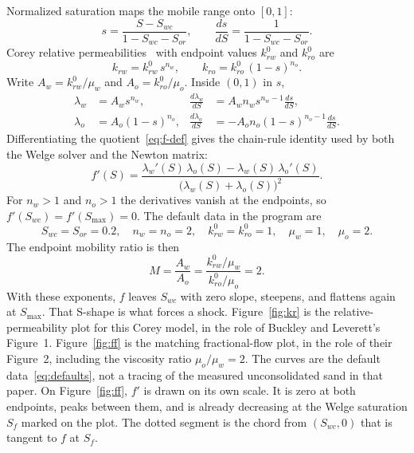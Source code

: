 \documentclass[11pt]{article}
\begin{document}
Normalized saturation maps the mobile range onto $[0,1]$:
\begin{equation}
\label{eq:sn}
s = \frac{S - S_{wc}}{1 - S_{wc} - S_{or}},
\qquad
\frac{ds}{dS} = \frac{1}{1 - S_{wc} - S_{or}}.
\end{equation}
Corey relative permeabilities~\cite{corey1954} with endpoint values $k_{rw}^{0}$ and $k_{ro}^{0}$ are
\begin{equation}
\label{eq:corey}
k_{rw} = k_{rw}^{0}\, s^{n_w},
\qquad
k_{ro} = k_{ro}^{0}\, (1-s)^{n_o}.
\end{equation}
Write $A_w = k_{rw}^{0}/\mu_w$ and $A_o = k_{ro}^{0}/\mu_o$.
Inside $(0,1)$ in $s$,
\begin{align}
\lambda_w &= A_w s^{n_w},
&
\frac{d\lambda_w}{dS} &= A_w n_w s^{n_w-1}\frac{ds}{dS},
\label{eq:dlw}\\
\lambda_o &= A_o (1-s)^{n_o},
&
\frac{d\lambda_o}{dS} &= -A_o n_o (1-s)^{n_o-1}\frac{ds}{dS}.
\label{eq:dlo}
\end{align}
Differentiating the quotient~\eqref{eq:f-def} gives the chain-rule identity used by both the Welge solver and the Newton matrix:
\begin{equation}
\label{eq:df}
f'(S)
=
\frac{
\lambda_w'(S)\,\lambda_o(S) - \lambda_w(S)\,\lambda_o'(S)
}{
\bigl(\lambda_w(S)+\lambda_o(S)\bigr)^2
}.
\end{equation}
For $n_w>1$ and $n_o>1$ the derivatives vanish at the endpoints, so $f'(S_{wc}) = f'(S_{\max}) = 0$.
The default data in the program are
\begin{equation}
\label{eq:defaults}
S_{wc} = S_{or} = 0.2,
\quad
n_w = n_o = 2,
\quad
k_{rw}^{0} = k_{ro}^{0} = 1,
\quad
\mu_w = 1,
\quad
\mu_o = 2.
\end{equation}
The endpoint mobility ratio is then
\begin{equation}
\label{eq:M}
M = \frac{A_w}{A_o} = \frac{k_{rw}^{0}/\mu_w}{k_{ro}^{0}/\mu_o} = 2.
\end{equation}
With these exponents, $f$ leaves $S_{wc}$ with zero slope, steepens, and flattens again at $S_{\max}$.
That S-shape is what forces a shock.
Figure~\ref{fig:kr} is the relative-permeability plot for this Corey model, in the role of Buckley and Leverett's Figure~1.
Figure~\ref{fig:ff} is the matching fractional-flow plot, in the role of their Figure~2, including the viscosity ratio $\mu_o/\mu_w = 2$.
The curves are the default data~\eqref{eq:defaults}, not a tracing of the measured unconsolidated sand in that paper.
On Figure~\ref{fig:ff}, $f'$ is drawn on its own scale.
It is zero at both endpoints, peaks between them, and is already decreasing at the Welge saturation $S_f$ marked on the plot.
The dotted segment is the chord from $(S_{wc},0)$ that is tangent to $f$ at $S_f$.
\end{document}

